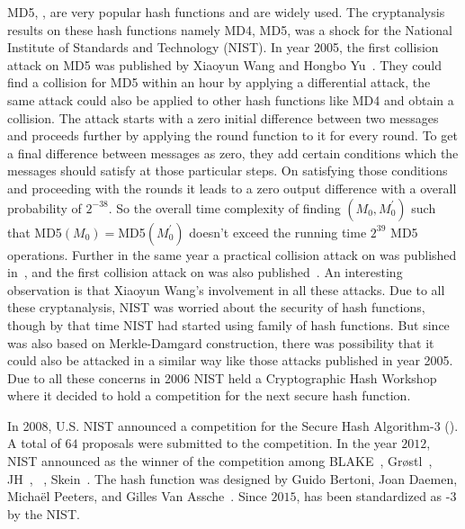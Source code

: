 MD5, ,  are very popular hash functions and are widely used. The cryptanalysis results on these hash functions namely MD4, MD5,  was a shock for the National Institute of Standards and Technology (NIST). In year 2005, the first collision attack on MD5 was published by Xiaoyun Wang and Hongbo Yu~\cite{wang2005break}. They could find a collision for MD5 within an hour by applying a differential attack, the same attack could also be applied to other hash functions like MD4 and obtain a collision. The attack starts with a zero initial difference between two messages and proceeds further by applying the round function to it for every round. To get a final difference between messages as zero, they add certain conditions which the messages should satisfy at those particular steps. On satisfying those conditions and proceeding with the rounds it leads to a zero output difference with a overall probability of $2^{-38}$. So the overall time complexity of finding $(M_0, M^\prime_0)$ such that MD5$(M_0) = $MD5$(M^\prime_0)$ doesn't exceed the running time $2^{39}$ MD5 operations. Further in the same year a practical collision attack on  was published in~\cite{wang2005efficient}, and the first collision attack on  was also published~\cite{wang2005finding}. An interesting observation is that Xiaoyun Wang's involvement in all these attacks. Due to all these cryptanalysis, NIST was worried about the security of hash functions, though by that time NIST had started using  family of hash functions. But since  was also based on Merkle-Damgard construction, there was possibility that it could also be attacked in a similar way like those attacks published in year 2005. Due to all these concerns in 2006 NIST held a Cryptographic Hash Workshop where it decided to hold a competition for the next secure hash function.

In 2008, U.S. NIST announced a competition for the Secure Hash Algorithm-3 (). A total of $64$ proposals were submitted to the competition. In the year $2012$, NIST announced \KECCAK{} as the winner of the competition among BLAKE~\cite{aumasson2008sha}, Gr\o stl~\cite{gauravaram2011s}, JH~\cite{wu2011hash}, \KECCAK{}~\cite{bertonikeccak}, Skein~\cite{fergusonskein}. The \KECCAK{} hash function was designed by Guido Bertoni, Joan Daemen, Micha\"{e}l Peeters, and Gilles Van Assche~\cite{bertoni2009keccak}. Since $2015$, \KECCAK{} has been standardized as \SHA-$3$ by the NIST.

\section{\KECCAK{}}

